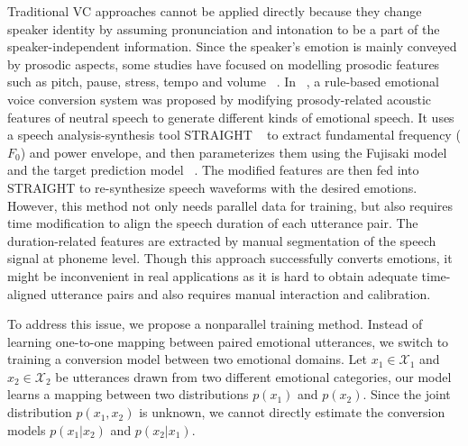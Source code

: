 \documentclass{article}
\begin{document}
Traditional VC approaches cannot be {\color{blue}applied directly} because they change speaker identity by assuming pronunciation and intonation to be a part of the speaker-independent information. Since the speaker's emotion is mainly conveyed by prosodic aspects, some studies {\color{blue}have focused} on modelling prosodic features such as pitch, pause, stress, tempo and volume  ~\cite{wang2012emotional, li2012emotional, wang2014multi}. In ~\cite{xue2018voice}, a rule-based emotional voice conversion system was proposed by modifying prosody-related acoustic features of neutral speech to generate different kinds of emotional speech. It uses a speech analysis-synthesis tool STRAIGHT ~\cite{kawahara1999restructuring} to extract fundamental frequency ($F_0$) and power envelope, and then parameterizes them {\color{blue}using the} Fujisaki model ~\cite{fujisaki1984analysis} and the target prediction model ~\cite{xue2016study}. The modified features are then fed into STRAIGHT to re-synthesize speech waveforms with the desired emotions. {\color{blue}However, this method not only needs parallel data for training, but also requires time modification to align the speech duration of each utterance pair. The duration-related features are extracted by manual segmentation of the speech signal at phoneme level. Though this approach successfully converts emotions, it might be inconvenient in real applications as it is hard to obtain adequate time-aligned utterance pairs and also requires manual interaction and calibration}.

To address this issue, we propose a nonparallel training method. Instead of learning one-to-one mapping between paired emotional utterances, we switch to training a conversion model between two emotional domains. Let $x_1 \in \mathcal{X}_1$ and $x_2 \in \mathcal{X}_2$ be utterances drawn from two different emotional categories, our model learns a mapping between two distributions $p(x_1)$ and $p(x_2)$. Since the joint distribution $p(x_1, x_2)$ is unknown, we cannot directly estimate the conversion models $p(x_1|x_2)$ and $p(x_2|x_1)$.
\end{document}
